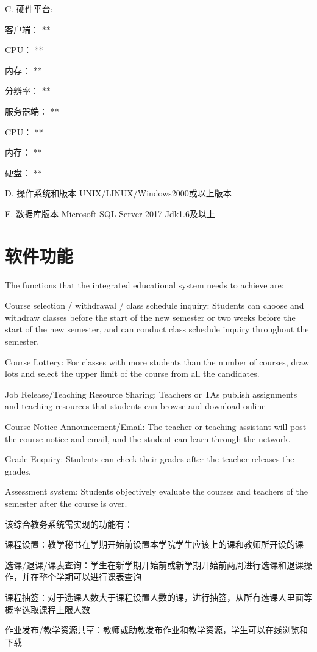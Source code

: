 	C. 硬件平台:

	客户端： **

	CPU： **

	内存： **

	分辨率： **

	服务器端： **

	CPU： **

	内存： **

	硬盘： **

	D. 操作系统和版本 UNIX/LINUX/Windows2000或以上版本

	E. 数据库版本 Microsoft SQL Server 2017  Jdk1.6及以上


\section{软件功能}
The functions that the integrated educational system needs to achieve are:

Course selection / withdrawal / class schedule inquiry: Students can choose and withdraw classes before the start of the new semester or two weeks before the start of the new semester, and can conduct class schedule inquiry throughout the semester.

Course Lottery: For classes with more students than the number of courses, draw lots and select the upper limit of the course from all the candidates.

Job Release/Teaching Resource Sharing: Teachers or TAs publish assignments and teaching resources that students can browse and download online

Course Notice Announcement/Email: The teacher or teaching assistant will post the course notice and email, and the student can learn through the network.

Grade Enquiry: Students can check their grades after the teacher releases the grades.

Assessment system: Students objectively evaluate the courses and teachers of the semester after the course is over.

该综合教务系统需实现的功能有：

课程设置：教学秘书在学期开始前设置本学院学生应该上的课和教师所开设的课

选课/退课/课表查询：学生在新学期开始前或新学期开始前两周进行选课和退课操作，并在整个学期可以进行课表查询

课程抽签：对于选课人数大于课程设置人数的课，进行抽签，从所有选课人里面等概率选取课程上限人数

作业发布/教学资源共享：教师或助教发布作业和教学资源，学生可以在线浏览和下载

